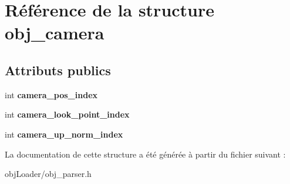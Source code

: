 \hypertarget{structobj__camera}{\section{Référence de la structure obj\-\_\-camera}
\label{structobj__camera}
}
\subsection*{Attributs publics}
\begin{DoxyCompactItemize}
\item 
\hypertarget{structobj__camera_a02c5e1c127fc81b0377d773572d82a8a}{int {\bfseries camera\-\_\-pos\-\_\-index}}\label{structobj__camera_a02c5e1c127fc81b0377d773572d82a8a}

\item 
\hypertarget{structobj__camera_ad795a90bb5ddd7298fac17af40317881}{int {\bfseries camera\-\_\-look\-\_\-point\-\_\-index}}\label{structobj__camera_ad795a90bb5ddd7298fac17af40317881}

\item 
\hypertarget{structobj__camera_a2d8ae90adcf03df3b2b28c3c13e1da5d}{int {\bfseries camera\-\_\-up\-\_\-norm\-\_\-index}}\label{structobj__camera_a2d8ae90adcf03df3b2b28c3c13e1da5d}

\end{DoxyCompactItemize}


La documentation de cette structure a été générée à partir du fichier suivant \-:\begin{DoxyCompactItemize}
\item 
obj\-Loader/obj\-\_\-parser.\-h\end{DoxyCompactItemize}
